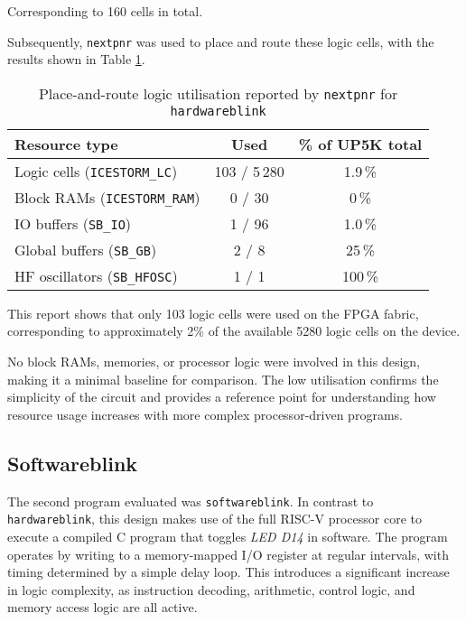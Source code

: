 \documentclass[a4paper,10pt]{article}
\begin{document}
Corresponding to 160 cells in total.

Subsequently, \texttt{nextpnr} was used to place and route these logic cells,
with the results shown in Table \ref{tab:hardware_pnr_report}.

\begin{table}[H]
    \centering
    \begin{tabularx}{0.7\textwidth}{X c c}
        \toprule
        Resource type & Used & \% of UP5K total \\ \midrule
        Logic cells (\texttt{ICESTORM\_LC}) & 103 / 5\,280 & 1.9\,\% \\
        Block RAMs (\texttt{ICESTORM\_RAM}) & 0 / 30 & 0\,\% \\
        IO buffers (\texttt{SB\_IO}) & 1 / 96 & 1.0\,\% \\
        Global buffers (\texttt{SB\_GB}) & 2 / 8  & 25\,\% \\
        HF oscillators (\texttt{SB\_HFOSC}) & 1 / 1  & 100\,\% \\ 
    \bottomrule
    \end{tabularx}
    \caption{Place-and-route logic utilisation reported by 
    \texttt{nextpnr} for \texttt{hardwareblink}}
    \label{tab:hardware_pnr_report}
\end{table}

This report shows that only 103 logic cells were used on the FPGA fabric, 
corresponding to approximately 2\% of the available 5280 logic cells 
on the device.


No block RAMs, memories, or processor logic were involved in this design, 
making it a minimal baseline for comparison. 
The low utilisation confirms the simplicity of the circuit 
and provides a reference point for understanding 
how resource usage increases with more complex processor-driven programs.


\subsection{Softwareblink}
\label{sec:Softwareblink}

The second program evaluated was \texttt{softwareblink}. 
In contrast to \texttt{hardwareblink}, 
this design makes use of the full RISC-V processor core 
to execute a compiled C program that toggles \textit{LED D14} in software. 
The program operates by writing to a memory-mapped I/O register at regular intervals, 
with timing determined by a simple delay loop. 
This introduces a significant increase in logic complexity, 
as instruction decoding, arithmetic, control logic, and memory access logic 
are all active.
\end{document}
